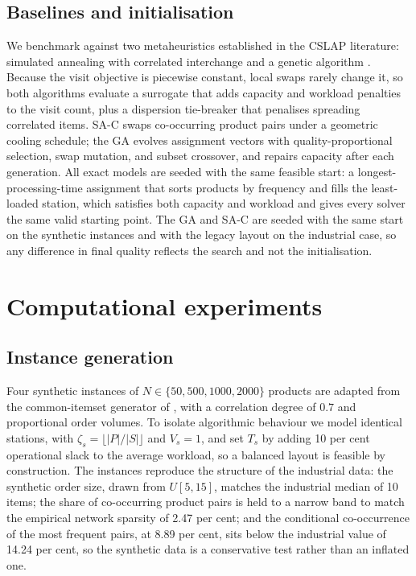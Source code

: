 \documentclass[]{interact}
\begin{document}
\subsection{Baselines and initialisation}\label{sec:baselines}
We benchmark against two metaheuristics established in the CSLAP literature: simulated annealing with correlated interchange \citep{kim2012, zhang2019cie} and a genetic algorithm \citep{pan2015}. Because the visit objective is piecewise constant, local swaps rarely change it, so both algorithms evaluate a surrogate that adds capacity and workload penalties to the visit count, plus a dispersion tie-breaker that penalises spreading correlated items. SA-C swaps co-occurring product pairs under a geometric cooling schedule; the GA evolves assignment vectors with quality-proportional selection, swap mutation, and subset crossover, and repairs capacity after each generation. All exact models are seeded with the same feasible start: a longest-processing-time assignment that sorts products by frequency and fills the least-loaded station, which satisfies both capacity and workload and gives every solver the same valid starting point. The GA and SA-C are seeded with the same start on the synthetic instances and with the legacy layout on the industrial case, so any difference in final quality reflects the search and not the initialisation.

\section{Computational experiments}\label{sec:experiments}
\subsection{Instance generation}
Four synthetic instances of $N \in \{50, 500, 1000, 2000\}$ products are adapted from the common-itemset generator of \citet{zhang2019cie}, with a correlation degree of $0.7$ and proportional order volumes. To isolate algorithmic behaviour we model identical stations, with $\zeta_s = \lfloor |P|/|S| \rfloor$ and $V_s = 1$, and set $T_s$ by adding 10 per cent operational slack to the average workload, so a balanced layout is feasible by construction. The instances reproduce the structure of the industrial data: the synthetic order size, drawn from $U[5,15]$, matches the industrial median of 10 items; the share of co-occurring product pairs is held to a narrow band to match the empirical network sparsity of 2.47 per cent; and the conditional co-occurrence of the most frequent pairs, at 8.89 per cent, sits below the industrial value of 14.24 per cent, so the synthetic data is a conservative test rather than an inflated one.
\end{document}
